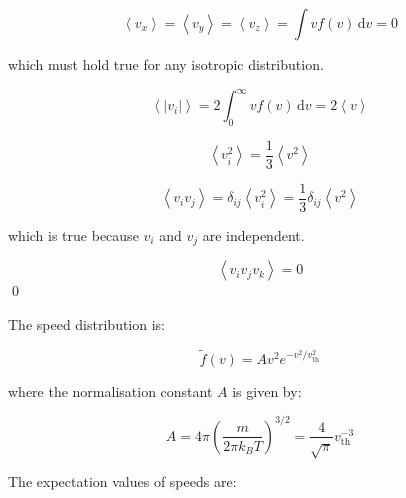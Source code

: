 \documentclass[12pt]{article}
\begin{document}

\begin{equation}
    \left\langle v_{x} \right\rangle = \left\langle v_{y} \right\rangle = \left\langle v_{z} \right\rangle = \int v f(v) \, \mathrm{d}v = 0
\end{equation}

which must hold true for any isotropic distribution.


\begin{equation}
    \left\langle \left\lvert v_{i} \right\rvert \right\rangle = 2 \int_{0}^{\infty} v f(v) \, \mathrm{d}v = 2 \left\langle v \right\rangle
\end{equation}


\begin{equation}
    \left\langle v_{i}^{2} \right\rangle = \frac{1}{3} \left\langle v^{2} \right\rangle
\end{equation}


\begin{equation}
    \left\langle v_{i} v_{j} \right\rangle = \delta_{ij} \left\langle v_{i}^{2} \right\rangle = \frac{1}{3} \delta_{ij} \left\langle v^{2} \right\rangle
\end{equation}

which is true because $v_{i}$ and $v_{j}$ are independent.


\begin{equation}
    \left\langle v_{i} v_{j} v_{k} \right\rangle = 0
\end{equation}
\qed



The speed distribution is:

\begin{equation}
    \tilde{f}(v) = A v^{2} e^{-v^{2}/v_{\text{th}}^{2}}
\end{equation}

where the normalisation constant $A$ is given by:

\begin{equation}
    A = 4\pi \left( \frac{m}{2\pi k_{B}T} \right)^{3/2} = \frac{4}{\sqrt{\pi}} v_{\text{th}}^{-3}
\end{equation}

The expectation values of speeds are:
\end{document}
